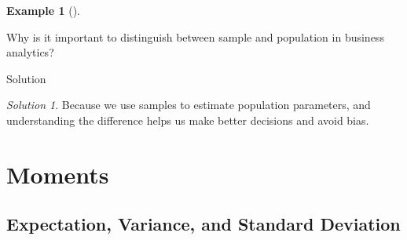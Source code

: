 \documentclass[
  12pt,
  letterpaper,
]{scrbook}
\theoremstyle{definition}
\newtheorem{example}{Example}[chapter]
\theoremstyle{plain}
\theoremstyle{remark}
\newtheorem{refsolution}{Solution}[chapter]
\begin{document}
\begin{example}[]\protect\hypertarget{exm-3}{}\label{exm-3}

Why is it important to distinguish between sample and population in
business analytics?

\end{example}

Solution

\begin{refsolution}
\leavevmode

Because we use samples to estimate population parameters, and
understanding the difference helps us make better decisions and avoid
bias.

\label{sol-3}

\end{refsolution}

\section{Moments}\label{moments}

\subsection{Expectation, Variance, and Standard
Deviation}\label{expectation-variance-and-standard-deviation}
\end{document}
